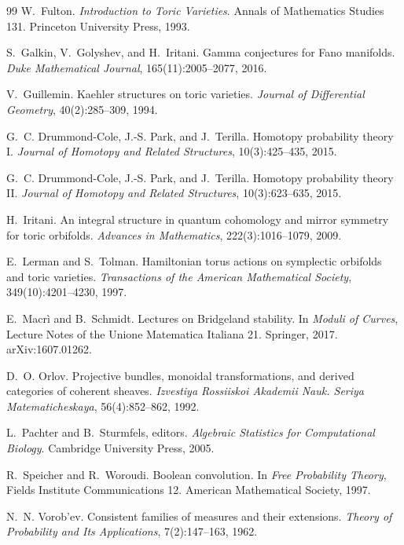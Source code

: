 \documentclass[11pt]{article}
\theoremstyle{definition}
\theoremstyle{remark}
\begin{document}
\begin{thebibliography}{99}
W.~Fulton.
\newblock \emph{Introduction to Toric Varieties}.
\newblock Annals of Mathematics Studies 131. Princeton University Press, 1993.

S.~Galkin, V.~Golyshev, and H.~Iritani.
\newblock Gamma conjectures for {F}ano manifolds.
\newblock \emph{Duke Mathematical Journal}, 165(11):2005--2077, 2016.

V.~Guillemin.
\newblock Kaehler structures on toric varieties.
\newblock \emph{Journal of Differential Geometry}, 40(2):285--309, 1994.

G.~C. Drummond-Cole, J.-S. Park, and J.~Terilla.
\newblock Homotopy probability theory {I}.
\newblock \emph{Journal of Homotopy and Related Structures}, 10(3):425--435, 2015.

G.~C. Drummond-Cole, J.-S. Park, and J.~Terilla.
\newblock Homotopy probability theory {II}.
\newblock \emph{Journal of Homotopy and Related Structures}, 10(3):623--635, 2015.

H.~Iritani.
\newblock An integral structure in quantum cohomology and mirror symmetry for toric orbifolds.
\newblock \emph{Advances in Mathematics}, 222(3):1016--1079, 2009.

E.~Lerman and S.~Tolman.
\newblock Hamiltonian torus actions on symplectic orbifolds and toric varieties.
\newblock \emph{Transactions of the American Mathematical Society}, 349(10):4201--4230, 1997.

E.~Macr\`i and B.~Schmidt.
\newblock Lectures on {B}ridgeland stability.
\newblock In \emph{Moduli of Curves}, Lecture Notes of the Unione Matematica Italiana 21. Springer,
2017. arXiv:1607.01262.

D.~O. Orlov.
\newblock Projective bundles, monoidal transformations, and derived categories of coherent sheaves.
\newblock \emph{Izvestiya Rossiiskoi Akademii Nauk. Seriya Matematicheskaya}, 56(4):852--862, 1992.

L.~Pachter and B.~Sturmfels, editors.
\newblock \emph{Algebraic Statistics for Computational Biology}.
\newblock Cambridge University Press, 2005.

R.~Speicher and R.~Woroudi.
\newblock Boolean convolution.
\newblock In \emph{Free Probability Theory}, Fields Institute Communications 12. American Mathematical
Society, 1997.

N.~N. Vorob'ev.
\newblock Consistent families of measures and their extensions.
\newblock \emph{Theory of Probability and Its Applications}, 7(2):147--163, 1962.

\end{thebibliography}
\end{document}

